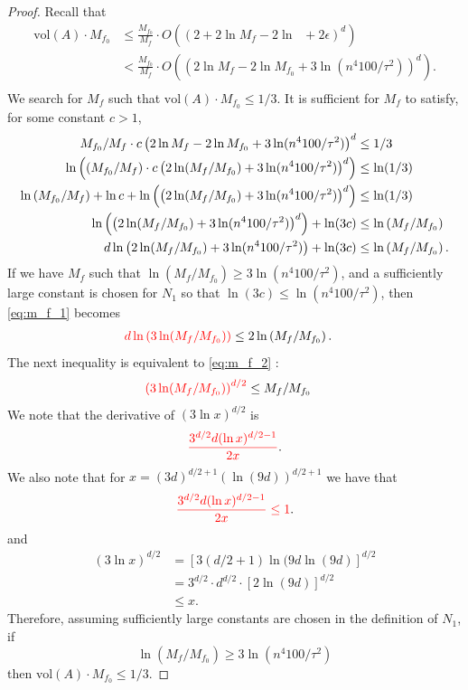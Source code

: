 \documentclass[final,12pt]{colt2018}
\newcommand{\nnew}[1]{{\color{red} #1}}
\newcommand{\nnew}[1]{#1}
\newtheorem{informal theorem}[theorem]{Theorem (informal statement)}
\newcommand{\eps}{\epsilon}
\newcommand{\pmin}{\mathop{p_{\mathrm{min}}}}
\newcommand{\vol}{\mathrm{vol}}
\begin{document}
\begin{proof}
Recall that
\begin{align*}
\vol(A) \cdot M_{f_0} &\leq \frac{M_{f_0}}{M_f} \cdot O\left( \left(2 + 2\ln M_f - 2\ln \pmin + 2\eps \right)^d \right) \\
&< \frac{M_{f_0}}{M_f} \cdot O\left( \left(2\ln M_f - 2\ln M_{f_0} + 3\ln(n^4 100/\tau^2) \right)^d \right). \\
\end{align*}
We search for $M_f$ such that $\vol(A) \cdot M_{f_0} \leq 1/3$. It is sufficient for $M_f$ to satisfy, for some constant $c>1$,
\nnew{\begin{align}
M_{f_0} / M_f \cdot c \left(2\ln M_f - 2\ln M_{f_0} + 3\ln(n^4 100/\tau^2) \right)^d &\leq 1/3 \notag \\
\ln\left( (M_{f_0} / M_f) \cdot c \left(2\ln(M_f / M_{f_0}) + 3\ln(n^4 100/\tau^2) \right)^d \right) &\leq \ln(1/3) \notag \\
\ln\left( M_{f_0} / M_f \right) + \ln c + \ln\left( \left(2\ln(M_f / M_{f_0}) + 3\ln(n^4 100/\tau^2) \right)^d \right) &\leq \ln(1/3) \notag \\
\ln\left( \left(2\ln(M_f / M_{f_0}) + 3\ln(n^4 100/\tau^2) \right)^d \right) + \ln(3c) &\leq \ln\left( M_f / M_{f_0} \right) \notag \\
d \ln\left( 2\ln(M_f / M_{f_0}) + 3\ln(n^4 100/\tau^2) \right) + \ln(3c) &\leq \ln\left( M_f / M_{f_0} \right). \label{eq:m_f_1}
\end{align}}
If we have $M_f$ such that $\ln(M_f / M_{f_0}) \geq 3\ln(n^4 100/\tau^2)$, 
and a sufficiently large constant is chosen for  {$N_1$} so that $\ln(3c) \leq \ln(n^4 100/\tau^2)$, 
then \eqref{eq:m_f_1} becomes
\begin{align}
\nnew{d \ln\left( 3\ln(M_f / M_{f_0}) \right)} &\leq 2\ln\left( M_f / M_{f_0} \right). \label{eq:m_f_2}
\end{align}
The next inequality is equivalent to \eqref{eq:m_f_2} {:}
\begin{align*}
\nnew{\left( 3\ln(M_f / M_{f_0}) \right)^{d/2}} &\leq M_f / M_{f_0} 
\end{align*}
We note that the derivative of \nnew{$(3 \ln x)^{d/2}$} is 
\[
\nnew{\frac{3^{d/2} d (\ln x)^{d/2 - 1}}{2x}}.
\]
We also note that for \nnew{$x = (3d)^{d/2 + 1}(\ln(9d))^{d/2+1}$} we have that
\[
\nnew{\frac{3^{d/2} d (\ln x)^{d/2 - 1}}{2x} \leq 1}.
\]
and
\nnew{\begin{align*}
(3\ln x)^{d/2} &= [3(d/2 + 1)\ln(9d\ln(9d)]^{d/2} \\
&= 3^{d/2} \cdot d^{d/2} \cdot [2\ln(9d)]^{d/2} \\
&\leq x.
\end{align*}}
Therefore, assuming sufficiently large constants are chosen in the definition of  {$N_1$}, if 
\[
\ln(M_f / M_{f_0}) \geq 3\ln(n^4 100/\tau^2)
\]
then $\vol(A) \cdot M_{f_0} \leq 1/3$.
\end{proof}
\end{document}
